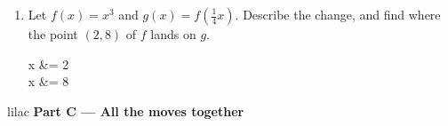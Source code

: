 \documentclass[10pt]{article}
\begin{document}
\begin{enumerate}[leftmargin=1.9em, itemsep=9pt, start=4]
      Graph A: \blank{1.8cm} \hfill
      Graph B: \blank{1.8cm} \hfill
      Graph C: \blank{1.8cm}

\item Let $f(x) = x^3$ and $g(x) = f\!\left(\tfrac{1}{4}x\right)$. Describe the change, and find
      where the point $(2, 8)$ of $f$ lands on $g$.

\begin{work}
  x &= 2 \\
              x &= 8
\end{work}

      \blank{6.4cm}

\end{enumerate}

\newpage

\begin{headlinebox}{lilac}
\textbf{\color{plum}Part C --- All the moves together}
\end{headlinebox}
\end{document}
